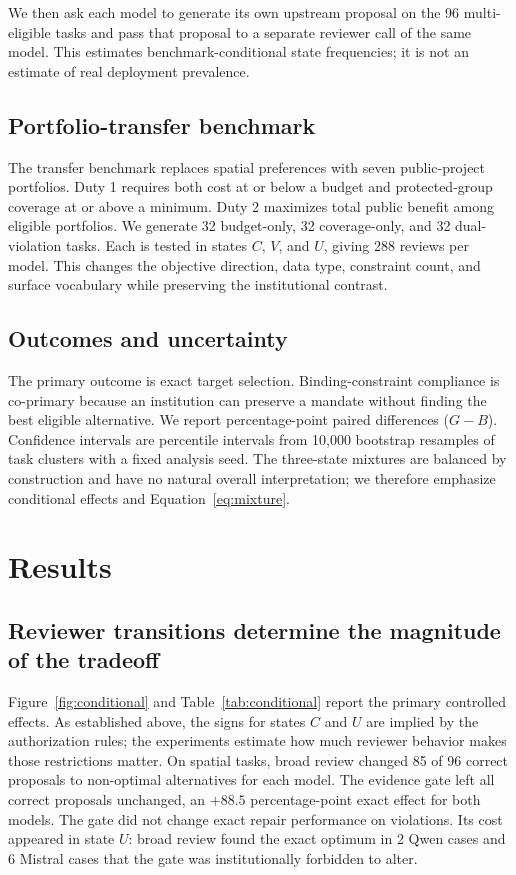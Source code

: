 \documentclass[10pt]{article}
\begin{document}
We then ask each model to generate its own upstream proposal on the 96
multi-eligible tasks and pass that proposal to a separate reviewer call of the
same model. This estimates benchmark-conditional state frequencies; it is not an
estimate of real deployment prevalence.

\subsection{Portfolio-transfer benchmark}

The transfer benchmark replaces spatial preferences with seven public-project
portfolios. Duty 1 requires both cost at or below a budget and protected-group
coverage at or above a minimum. Duty 2 maximizes total public benefit among
eligible portfolios. We generate 32 budget-only, 32 coverage-only, and 32 dual-
violation tasks. Each is tested in states $C$, $V$, and $U$, giving 288 reviews
per model. This changes the objective direction, data type, constraint count,
and surface vocabulary while preserving the institutional contrast.

\subsection{Outcomes and uncertainty}

The primary outcome is exact target selection. Binding-constraint compliance is
co-primary because an institution can preserve a mandate without finding the
best eligible alternative. We report percentage-point paired differences
($G-B$). Confidence intervals are percentile intervals from 10,000 bootstrap
resamples of task clusters with a fixed analysis seed. The three-state mixtures
are balanced by construction and have no natural overall interpretation; we
therefore emphasize conditional effects and Equation~\ref{eq:mixture}.

\section{Results}

\subsection{Reviewer transitions determine the magnitude of the tradeoff}

Figure~\ref{fig:conditional} and Table~\ref{tab:conditional} report the primary
controlled effects. As established above, the signs for states $C$ and $U$ are
implied by the authorization rules; the experiments estimate how much reviewer
behavior makes those restrictions matter. On spatial tasks, broad review changed
85 of 96 correct
proposals to non-optimal alternatives for each model. The evidence gate left all
correct proposals unchanged, an $+88.5$ percentage-point exact effect for both
models. The gate did not change exact repair performance on violations. Its cost
appeared in state $U$: broad review found the exact optimum in 2 Qwen cases and
6 Mistral cases that the gate was institutionally forbidden to alter.
\end{document}
